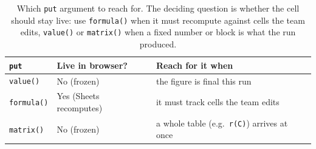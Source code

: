 \documentclass[
    a4paper,
    fontsize=10pt,
    twoside=true,
    numbers=noenddot,
]{kaobook}
\begin{document}
\begin{table}[htbp]
\centering
\footnotesize
\caption[Choosing among put's writing modes]{Which \texttt{put} argument to reach for. The deciding question is whether the cell should stay live: use \texttt{formula()} when it must recompute against cells the team edits, \texttt{value()} or \texttt{matrix()} when a fixed number or block is what the run produced.}
\label{tab:ch11-viz-put}
\begin{tabular}{@{}llp{8.6cm}@{}}
\toprule
\texttt{put} & Live in browser? & Reach for it when \\
\midrule
\texttt{value()}   & No (frozen)  & the figure is final this run \\
\texttt{formula()} & Yes (Sheets recomputes) & it must track cells the team edits \\
\texttt{matrix()}  & No (frozen)  & a whole table (e.g.\ \texttt{r(C)}) arrives at once \\
\bottomrule
\end{tabular}
\end{table}
\end{document}
